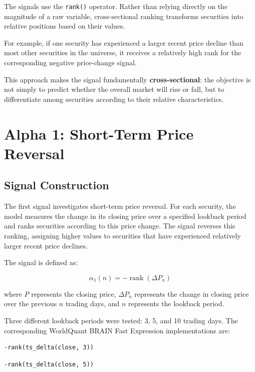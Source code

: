 \documentclass{article}
\begin{document}
The signals use the \verb|rank()| operator. Rather than relying directly on the magnitude of a raw variable, cross-sectional ranking transforms securities into relative positions based on their values.

For example, if one security has experienced a larger recent price decline than most other securities in the universe, it receives a relatively high rank for the corresponding negative price-change signal.

This approach makes the signal fundamentally \textbf{cross-sectional}: the objective is not simply to predict whether the overall market will rise or fall, but to differentiate among securities according to their relative characteristics.

\section{Alpha 1: Short-Term Price Reversal}


\subsection{Signal Construction}

The first signal investigates short-term price reversal. For each security, the model measures the change in its closing price over a specified lookback period and ranks securities according to this price change. The signal reverses this ranking, assigning higher values to securities that have experienced relatively larger recent price declines.

The signal is defined as:

\begin{equation}
\alpha_1(n) = -\operatorname{rank}\left(\Delta P_n\right)
\end{equation}

where \(P\) represents the closing price, \(\Delta P_n\) represents the change in closing price over the previous \(n\) trading days, and \(n\) represents the lookback period.

Three different lookback periods were tested: 3, 5, and 10 trading days. The corresponding WorldQuant BRAIN Fast Expression implementations are:

\begin{verbatim}
-rank(ts_delta(close, 3))
\end{verbatim}

\begin{verbatim}
-rank(ts_delta(close, 5))
\end{verbatim}
\end{document}
